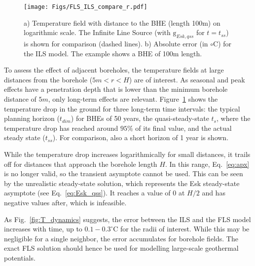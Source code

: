 \begin{figure}[t]
    \centering
    \texttt{[image: Figs/FLS\_ILS\_compare\_r.pdf]}
    \caption{a) Temperature field with distance to the BHE (length 100m) on logarithmic scale. The Infinite Line Source (with $\mathrm{g}_{Esk, qss}$ for $t = t_{ss}$) is shown for comparison (dashed lines). b) Absolute error (in $\circ$C) for the ILS model. The example shows a BHE of 100m length.}
    \label{fig:r_field}
\end{figure}

To assess the effect of adjacent boreholes, the temperature fields at large distances from the borehole ($5m < r < H$) are of interest. As seasonal and peak effects have a penetration depth that is lower than the minimum borehole distance of $5m$, only long-term effects are relevant. Figure~\ref{fig:r_field} shows the temperature drop in the ground for three long-term time intervals: the typical planning horizon ($t_{dim}$) for BHEs of 50 years, the quasi-steady-state $t_s$, where the temperature drop has reached around $95\%$ of its final value, and the actual steady state ($t_{ss}$). For comparison, also a short horizon of 1 year is shown.

While the temperature drop increases logarithmically for small distances, it trails off for distances that approach the borehole length $H$. In this range, Eq.~\ref{eq:apx} is no longer valid, so the transient asymptote cannot be used. This can be seen by the unrealistic steady-state solution, which represents the Esk steady-state asymptote (see Eq.~\ref{eq:Esk_qss}). It reaches a value of $0$ at $H/2$ and has negative values after, which is infeasible.

As Fig.~\ref{fig:T_dynamics} suggests, the error between the ILS and the FLS model increases with time, up to $0.1-0.3 ^\circ$C for the radii of interest. While this may  be negligible for a single neighbor, the error accumulates for borehole fields.  The exact FLS solution should hence be used for modelling large-scale geothermal potentials.


